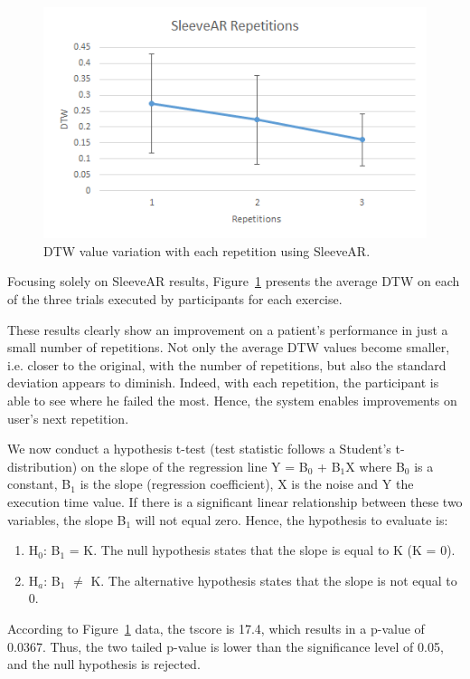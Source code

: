 \begin{figure}[!t]
    \centering
    \includegraphics{imgs/results/dtw_repetitions.png}
    \caption{DTW value variation with each repetition using SleeveAR.}
    \label{fig:dtw_repetitions}
\end{figure}

Focusing solely on SleeveAR results, Figure~\ref{fig:dtw_repetitions} presents the average DTW on each of the three trials executed by participants for each exercise. 

These results clearly show an improvement on a patient's performance in just a small number of repetitions. 
Not only the average DTW values become smaller, i.e. closer to the original, with the number of repetitions, but also the standard deviation appears to diminish. 
Indeed, with each repetition, the participant is able to see where he failed the most. Hence,
the system enables improvements on user's next repetition.

We now conduct a hypothesis t-test (test statistic follows a Student's t-distribution) on the slope of the regression line Y = B$_0$ + B$_1$X where B$_0$ is a constant, B$_1$ is the slope (regression coefficient), X is the noise and Y the execution time value.
If there is a significant linear relationship between these two variables, the slope B$_1$ 
will not equal zero. Hence, the hypothesis to evaluate is:
\begin{enumerate}
\item H$_0$: B$_1$ = K. The null hypothesis states that the slope is equal to K (K = 0).
\item H$_a$: B$_1$ $\neq$ K. The alternative hypothesis states that the slope is not equal to 0.
\end{enumerate}
According to Figure~\ref{fig:dtw_repetitions} data, the tscore is 17.4, which results in a p-value of 0.0367.
Thus, the two tailed p-value is lower than the significance level of 0.05, and the null hypothesis is rejected.

